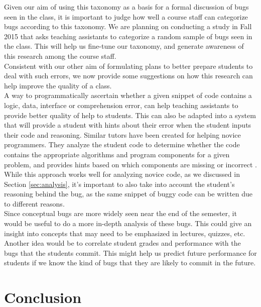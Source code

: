 \documentclass{sig-alternate}
\begin{document}
Given our aim of using this taxonomy as a basis for a formal discussion of bugs seen in the class, it is important to judge how well a course staff can categorize bugs according to this taxonomy. We are planning on conducting a study in Fall 2015 that asks teaching assistants to categorize a random sample of bugs seen in the class. This will help us fine-tune our taxonomy, and generate awareness of this research among the course staff.\\

Consistent with our other aim of formulating plans to better prepare students to deal with such errors, we now provide some suggestions on how this research can help improve the quality of a class.\\

A way to programmatically ascertain whether a given snippet of code contains a logic, data, interface or comprehension error, can help teaching assistants to provide better quality of help to students. This can also be adapted into a system that will provide a student with hints about their error when the student inputs their code and reasoning. Similar tutors have been created for helping novice programmers. They analyze the student code to determine whether the code contains the appropriate algorithms and program components for a given problem, and provides hints based on which components are missing or incorrect \cite{Sudol-DeLyser14}. While this approach works well for analyzing novice code, as we discussed in Section \ref{sec:analysis}, it's important to also take into account the student's reasoning behind the bug, as the same snippet of buggy code can be written due to different reasons.\\

Since conceptual bugs are more widely seen near the end of the semester, it would be useful to do a more in-depth analysis of these bugs. This could give an insight into concepts that may need to be emphasized in lectures, quizzes, etc.\\

Another idea would be to correlate student grades and performance with the bugs that the students commit. This might help us predict future performance for students if we know the kind of bugs that they are likely to commit in the future.

\section{Conclusion}
\end{document}
